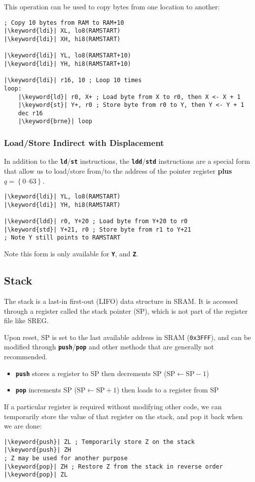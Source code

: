 \documentclass{article}
\newcommand{\keyword}[1]{\textcolor[rgb]{0.00,0.50,0.00}{\textbf{#1}}}
\newcommand{\keywordinline}[1]{\textcolor[rgb]{0.00,0.50,0.00}{\textbf{\texttt{#1}}}}
\begin{document}
This operation can be used to copy bytes from one location to another:
\begin{verbatim}
; Copy 10 bytes from RAM to RAM+10
|\keyword{ldi}| XL, lo8(RAMSTART)
|\keyword{ldi}| XH, hi8(RAMSTART)

|\keyword{ldi}| YL, lo8(RAMSTART+10)
|\keyword{ldi}| YH, hi8(RAMSTART+10)

|\keyword{ldi}| r16, 10 ; Loop 10 times
loop:
    |\keyword{ld}| r0, X+ ; Load byte from X to r0, then X <- X + 1
    |\keyword{st}| Y+, r0 ; Store byte from r0 to Y, then Y <- Y + 1
    dec r16
    |\keyword{brne}| loop
\end{verbatim}
\subsubsection{Load/Store Indirect with Displacement}
In addition to the \keywordinline{ld}/\keywordinline{st} instructions,
the \keywordinline{ldd}/\keywordinline{std} instructions are a special
form that allow us to load/store from/to the address of the pointer
register \textbf{plus} \(q = \left\{ \numrange{0}{63} \right\}\).
\begin{verbatim}
|\keyword{ldi}| YL, lo8(RAMSTART)
|\keyword{ldi}| YH, hi8(RAMSTART)

|\keyword{ldd}| r0, Y+20 ; Load byte from Y+20 to r0
|\keyword{std}| Y+21, r0 ; Store byte from r1 to Y+21
; Note Y still points to RAMSTART
\end{verbatim}
Note this form is only available for \keywordinline{Y}, and
\keywordinline{Z}.
\subsection{Stack}
The stack is a last-in first-out (LIFO) data structure in SRAM\@. It is
accessed through a register called the stack pointer (SP), which is not
part of the register file like SREG\@.

Upon reset, SP is set to the last available address in SRAM
(\texttt{0x3FFF}), and can be modified through
\keywordinline{push}/\keywordinline{pop} and other methods that are
generally not recommended.
\begin{itemize}
    \item \keywordinline{push} stores a register to SP then decrements SP (\(\mathrm{SP} \leftarrow \mathrm{SP} - 1\))
    \item \keywordinline{pop} increments SP (\(\mathrm{SP} \leftarrow \mathrm{SP} + 1\)) then loads to a register from SP
\end{itemize}
If a particular register is required without modifying other code, we can temporarily
store the value of that register on the stack, and pop it back when we are done:
\begin{verbatim}
|\keyword{push}| ZL ; Temporarily store Z on the stack
|\keyword{push}| ZH
; Z may be used for another purpose
|\keyword{pop}| ZH ; Restore Z from the stack in reverse order
|\keyword{pop}| ZL
\end{verbatim}
\end{document}
